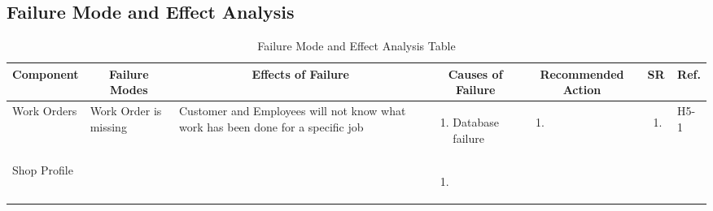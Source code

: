 \documentclass{article}
\begin{document}
\newpage
\begin{landscape}
	\section{Failure Mode and Effect Analysis}
	\begin{table}[H]
		\centering
		\caption{Failure Mode and Effect Analysis Table}
		\begin{adjustbox}{width=\paperwidth}
			\begin{tabular}{|p{0.15\textwidth}|p{}|p{0.25\textwidth}|p{}|p{}|p{}|p{}|}
				\hline
				\multicolumn{1}{|c|}{\textbf{Component}}
				               & \multicolumn{1}{|c|}{\textbf{Failure Modes}}
				               & \multicolumn{1}{|c|}{\textbf{Effects of Failure}}
				               & \multicolumn{1}{|c|}{\textbf{Causes of Failure}}
				               & \multicolumn{1}{|c|}{\textbf{Recommended Action}}
				               & \multicolumn{1}{|c|}{\textbf{SR}}
				               & \multicolumn{1}{|c|}{\textbf{Ref.}}                                               \\
				\hline
				Work Orders
				               & Work Order is missing
				               & Customer and Employees will not know what work has been done for a specific job
				               & \begin{enumerate}[label=\alph*, leftmargin=*]
					                 \item Database failure
				                 \end{enumerate}
				               & \begin{enumerate}[label=\alph*, leftmargin=*]
					                 \item
				                 \end{enumerate}
				               & \begin{enumerate}[label=\alph*, leftmargin=*]
					                 \item
				                 \end{enumerate}
				               & H5-1                                                                            \\
				\hline
				Shop Profile
				               & ~
				               & ~
				               & \begin{enumerate}[label=\alph*, leftmargin=*]
					                 \item
				                 \end{enumerate}

\end{tabular}
\end{adjustbox}
\end{table}
\end{landscape}
\end{document}

